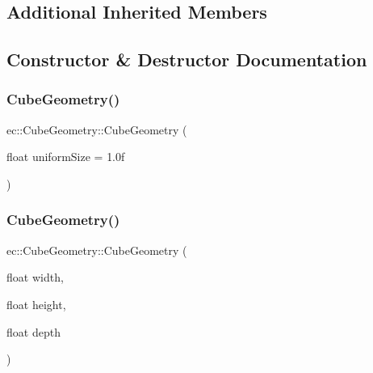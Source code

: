 \subsection*{Additional Inherited Members}


\subsection{Constructor \& Destructor Documentation}
\mbox{\label{classec_1_1_cube_geometry_a539617a3a7e98e1a09af01e2328bac30}} 
\subsubsection{\texorpdfstring{Cube\+Geometry()}{CubeGeometry()}\hspace{0.1cm}{\footnotesize\ttfamily [1/2]}}
{\footnotesize\ttfamily ec\+::\+Cube\+Geometry\+::\+Cube\+Geometry (\begin{DoxyParamCaption}\item[{float}]{uniform\+Size = {\ttfamily 1.0f} }\end{DoxyParamCaption})\hspace{0.3cm}{\ttfamily [explicit]}}

\mbox{\label{classec_1_1_cube_geometry_ac4ffe05d266c00e8e337233c4c48d29f}} 
\subsubsection{\texorpdfstring{Cube\+Geometry()}{CubeGeometry()}\hspace{0.1cm}{\footnotesize\ttfamily [2/2]}}
{\footnotesize\ttfamily ec\+::\+Cube\+Geometry\+::\+Cube\+Geometry (\begin{DoxyParamCaption}\item[{float}]{width,  }\item[{float}]{height,  }\item[{float}]{depth }\end{DoxyParamCaption})\hspace{0.3cm}{\ttfamily [explicit]}}

